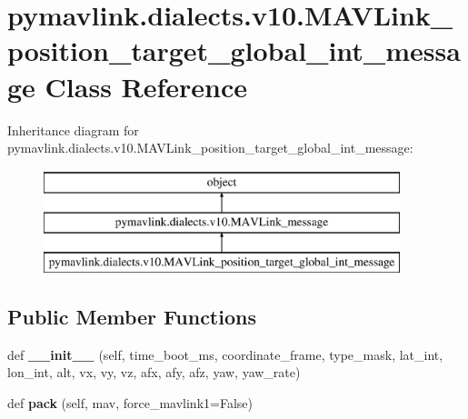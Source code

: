 \hypertarget{classpymavlink_1_1dialects_1_1v10_1_1MAVLink__position__target__global__int__message}{}\section{pymavlink.\+dialects.\+v10.\+M\+A\+V\+Link\+\_\+position\+\_\+target\+\_\+global\+\_\+int\+\_\+message Class Reference}
\label{classpymavlink_1_1dialects_1_1v10_1_1MAVLink__position__target__global__int__message}
Inheritance diagram for pymavlink.\+dialects.\+v10.\+M\+A\+V\+Link\+\_\+position\+\_\+target\+\_\+global\+\_\+int\+\_\+message\+:\begin{figure}[H]
\begin{center}
\leavevmode
\includegraphics[height=3.000000cm]{classpymavlink_1_1dialects_1_1v10_1_1MAVLink__position__target__global__int__message}
\end{center}
\end{figure}
\subsection*{Public Member Functions}
\begin{DoxyCompactItemize}
\item 
\mbox{\label{classpymavlink_1_1dialects_1_1v10_1_1MAVLink__position__target__global__int__message_ae5d0f6b933a535f9c64c7cf9b8100bc4}} 
def {\bfseries \+\_\+\+\_\+init\+\_\+\+\_\+} (self, time\+\_\+boot\+\_\+ms, coordinate\+\_\+frame, type\+\_\+mask, lat\+\_\+int, lon\+\_\+int, alt, vx, vy, vz, afx, afy, afz, yaw, yaw\+\_\+rate)
\item 
\mbox{\label{classpymavlink_1_1dialects_1_1v10_1_1MAVLink__position__target__global__int__message_a7b6c01adaf8276d96817bcecab96b759}} 
def {\bfseries pack} (self, mav, force\+\_\+mavlink1=False)
\end{DoxyCompactItemize}
